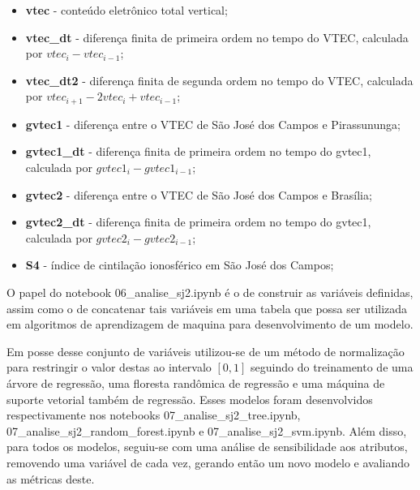 \begin{itemize}
\item {\bf vtec} - conteúdo eletrônico total vertical;
\item {\bf vtec\_dt} - diferença finita de primeira ordem no tempo do VTEC, calculada por $vtec_i-vtec_{i-1}$;
\item {\bf vtec\_dt2} - diferença finita de segunda ordem no tempo do VTEC, calculada por $vtec_{i+1}-2vtec_i+vtec_{i-1}$;
\item {\bf gvtec1} - diferença entre o VTEC de São José dos Campos e Pirassununga;
\item {\bf gvtec1\_dt} - diferença finita de primeira ordem no tempo do gvtec1, calculada por $gvtec1_i-gvtec1_{i-1}$;
\item {\bf gvtec2} - diferença entre o VTEC de São José dos Campos e Brasília;
\item {\bf gvtec2\_dt} - diferença finita de primeira ordem no tempo do gvtec1, calculada por $gvtec2_i-gvtec2_{i-1}$;
\item {\bf S4} - índice de cintilação ionosférico em São José dos Campos;
\end{itemize}

O papel do notebook 06\_analise\_sj2.ipynb é o de construir as variáveis definidas, assim como o de concatenar tais variáveis em uma tabela que possa ser utilizada em algoritmos de aprendizagem de maquina para desenvolvimento de um modelo.

Em posse desse conjunto de variáveis utilizou-se de um método de normalização para restringir o valor destas ao intervalo $[0,1]$ seguindo do treinamento de uma árvore de regressão, uma floresta randômica de regressão e uma máquina de suporte vetorial também de regressão. Esses modelos foram desenvolvidos respectivamente nos notebooks 07\_analise\_sj2\_tree.ipynb, 07\_analise\_sj2\_random\_forest.ipynb e 07\_analise\_sj2\_svm.ipynb. Além disso, para todos os modelos, seguiu-se com uma análise de sensibilidade aos atributos, removendo uma variável de cada vez, gerando então um novo modelo e avaliando as métricas deste.
